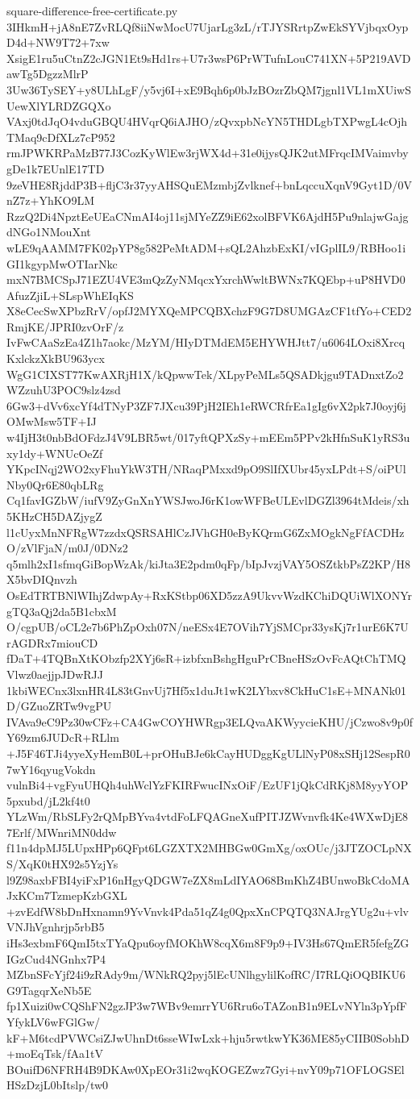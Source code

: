 \documentclass[11pt]{article}
\theoremstyle{definition}
\theoremstyle{remark}
\begin{document}
\begin{filecontents*}[overwrite]{square-difference-free-certificate.py}
3IHkmH+jA8nE7ZvRLQf8iiNwMocU7UjarLg3zL/rTJYSRrtpZwEkSYVjbqxOypD4d+NW9T72+7xw
XsigE1ru5uCtnZ2cJGN1Et9sHd1rs+U7r3wsP6PrWTufnLouC741XN+5P219AVDawTg5DgzzMlrP
3Uw36TySEY+y8ULhLgF/y5vj6I+xE9Bqh6p0bJzBOzrZbQM7jgnl1VL1mXUiwSUewXlYLRDZGQXo
VAxj0tdJqO4vduGBQU4HVqrQ6iAJHO/zQvxpbNcYN5THDLgbTXPwgL4cOjhTMaq9cDfXLz7cP952
rmJPWKRPaMzB77J3CozKyWlEw3rjWX4d+31e0ijysQJK2utMFrqcIMVaimvbygDe1k7EUnlE17TD
9zeVHE8RjddP3B+fljC3r37yyAHSQuEMzmbjZvlknef+bnLqccuXqnV9Gyt1D/0VnZ7z+YhKO9LM
RzzQ2Di4NpztEeUEaCNmAI4oj11sjMYeZZ9iE62xolBFVK6AjdH5Pu9nlajwGajgdNGo1NMouXnt
wLE9qAAMM7FK02pYP8g582PeMtADM+sQL2AhzbExKI/vIGplIL9/RBHoo1iGI1kgypMwOTIarNkc
mxN7BMCSpJ71EZU4VE3mQzZyNMqcxYxrchWwltBWNx7KQEbp+uP8HVD0AfuzZjiL+SLspWhEIqKS
X8eCecSwXPbzRrV/opfJ2MYXQeMPCQBXchzF9G7D8UMGAzCF1tfYo+CED2RmjKE/JPRI0zvOrF/z
IvFwCAaSzEa4Z1h7aokc/MzYM/HIyDTMdEM5EHYWHJtt7/u6064LOxi8XrcqKxlckzXkBU963ycx
WgG1CIXST77KwAXRjH1X/kQpwwTek/XLpyPeMLs5QSADkjgu9TADnxtZo2WZzuhU3POC9slz4zsd
6Gw3+dVv6xcYf4dTNyP3ZF7JXcu39PjH2IEh1eRWCRfrEa1gIg6vX2pk7J0oyj6jOMwMsw5TF+IJ
w4IjH3t0nbBdOFdzJ4V9LBR5wt/017yftQPXzSy+mEEm5PPv2kHfnSuK1yRS3uxy1dy+WNUcOeZf
YKpcINqj2WO2xyFhuYkW3TH/NRaqPMxxd9pO9SlIfXUbr45yxLPdt+S/oiPUlNby0Qr6E80qbLRg
Cq1favIGZbW/iufV9ZyGnXnYWSJwoJ6rK1owWFBeULEvlDGZl3964tMdeis/xh5KHzCH5DAZjygZ
l1cUyxMnNFRgW7zzdxQSRSAHlCzJVhGH0eByKQrmG6ZxMOgkNgFfACDHzO/zVlFjaN/m0J/0DNz2
q5mlh2xI1sfmqGiBopWzAk/kiJta3E2pdm0qFp/bIpJvzjVAY5OSZtkbPsZ2KP/H8X5bvDIQnvzh
OsEdTRTBNlWIhjZdwpAy+RxKStbp06XD5zzA9UkvvWzdKChiDQUiWlXONYrgTQ3aQj2da5B1cbxM
O/cgpUB/oCL2e7b6PhZpOxh07N/neESx4E7OVih7YjSMCpr33ysKj7r1urE6K7UrAGDRx7miouCD
fDaT+4TQBnXtKObzfp2XYj6sR+izbfxnBshgHguPrCBneHSzOvFcAQtChTMQVlwz0aejjpJDwRJJ
1kbiWECnx3lxnHR4L83tGnvUj7Hf5x1duJt1wK2LYbxv8CkHuC1sE+MNANk01D/GZuoZRTw9vgPU
IVAva9eC9Pz30wCFz+CA4GwCOYHWRgp3ELQvaAKWyycieKHU/jCzwo8v9p0fY69zm6JUDcR+RLlm
+J5F46TJi4yyeXyHemB0L+prOHuBJe6kCayHUDggKgULlNyP08xSHj12SespR07wY16qyugVokdn
vulnBi4+vgFyuUHQh4uhWclYzFKIRFwucINxOiF/EzUF1jQkCdRKj8M8yyYOP5pxubd/jL2kf4t0
YLzWm/RbSLFy2rQMpBYva4vtdFoLFQAGneXufPITJZWvnvfk4Ke4WXwDjE87Erlf/MWnriMN0ddw
f11n4dpMJ5LUpxHPp6QFpt6LGZXTX2MHBGw0GmXg/oxOUc/j3JTZOCLpNXS/XqK0tHX92s5YzjYs
l9Z98axbFBI4yiFxP16nHgyQDGW7eZX8mLdIYAO68BmKhZ4BUnwoBkCdoMAJxKCm7TzmepKzbGXL
+zvEdfW8bDnHxnamn9YvVnvk4Pda51qZ4g0QpxXnCPQTQ3NAJrgYUg2u+vlvVNJhVgnhrjp5rbB5
iHs3exbmF6QmI5txTYaQpu6oyfMOKhW8cqX6m8F9p9+IV3Hs67QmER5fefgZGIGzCud4NGnhx7P4
MZbnSFcYjf24i9zRAdy9m/WNkRQ2pyj5lEcUNlhgylilKofRC/I7RLQiOQBIKU6G9TagqrXeNb5E
fp1Xuizi0wCQShFN2gzJP3w7WBv9emrrYU6Rru6oTAZonB1n9ELvNYln3pYpfFYfykLV6wFGlGw/
kF+M6tcdPVWCsiZJwUhnDt6sseWIwLxk+hju5rwtkwYK36ME85yCIIB0SobhD+moEqTsk/fAa1tV
BOuifD6NFRH4B9DKAw0XpEOr31i2wqKOGEZwz7Gyi+nvY09p71OFLOGSElHSzDzjL0bItslp/tw0

\end{filecontents*}
\end{document}
